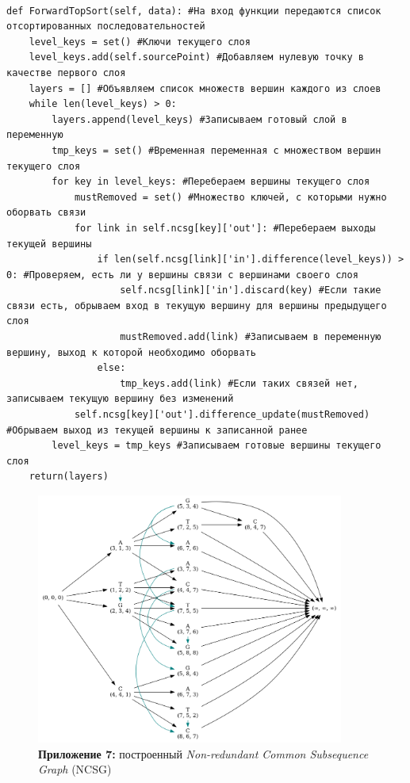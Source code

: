 \documentclass[a4paper,12pt]{extarticle}
\begin{document}
\begin{verbatim}

def ForwardTopSort(self, data): #На вход функции передаются список отсортированных последовательностей
    level_keys = set() #Ключи текущего слоя
    level_keys.add(self.sourcePoint) #Добавляем нулевую точку в качестве первого слоя
    layers = [] #Объявляем список множеств вершин каждого из слоев
    while len(level_keys) > 0:
        layers.append(level_keys) #Записываем готовый слой в переменную
        tmp_keys = set() #Временная переменная с множеством вершин текущего слоя
        for key in level_keys: #Перебераем вершины текущего слоя
            mustRemoved = set() #Множество ключей, с которыми нужно оборвать связи
            for link in self.ncsg[key]['out']: #Перебераем выходы текущей вершины
                if len(self.ncsg[link]['in'].difference(level_keys)) > 0: #Проверяем, есть ли у вершины связи с вершинами своего слоя
                    self.ncsg[link]['in'].discard(key) #Если такие связи есть, обрываем вход в текущую вершину для вершины предыдущего слоя
                    mustRemoved.add(link) #Записываем в переменную вершину, выход к которой необходимо оборвать
                else:
                    tmp_keys.add(link) #Если таких связей нет, записываем текущую вершину без изменений
            self.ncsg[key]['out'].difference_update(mustRemoved) #Обрываем выход из текущей вершины к записанной ранее
        level_keys = tmp_keys #Записываем готовые вершины текущего слоя
    return(layers)

\end{verbatim}

\begin{figure}[h!]
  \centering
  \caption*{\textbf{Приложение 7:} построенный \textit{Non-redundant Common Subsequence Graph} (NCSG)}
  \label{ncsg:3}
  \includegraphics[width=0.9\textwidth]{Graph_1.png}
\end{figure}
\end{document}
